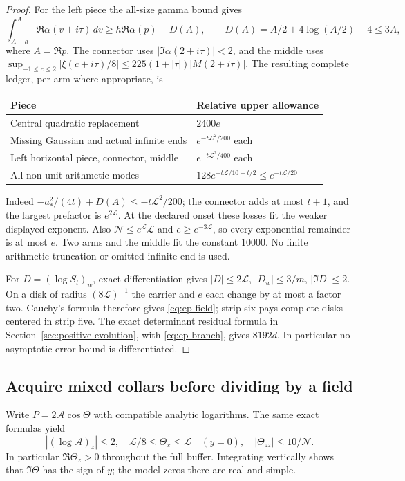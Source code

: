 \begin{proof}
For the left piece the all-size gamma bound gives
\[
 \int_{A-h}^{A}\Re\alpha(v+i\tau)\,dv
 \ge h\Re\alpha(p)-D(A),\qquad
 D(A)=A/2+4\log(A/2)+4\le3A,
\]
where $A=\Re p$. The connector uses $|\Im\alpha(2+i\tau)|<2$,
and the middle uses
$\sup_{-1\le c\le2}|\xi(c+i\tau)/8|
 \le225(1+|\tau|)|M(2+i\tau)|$.
The resulting complete ledger, per arm where appropriate, is
\begin{center}\small
\begin{tabular}{@{}ll@{}}\toprule
Piece & Relative upper allowance\\\midrule
Central quadratic replacement & $2400e$\\
Missing Gaussian and actual infinite ends & $e^{-t\mathcal L^2/200}$ each\\
Left horizontal piece, connector, middle & $e^{-t\mathcal L^2/400}$ each\\
All non-unit arithmetic modes & $128e^{-t\mathcal L/10+t/2}
                                      \le e^{-t\mathcal L/20}$\\\bottomrule
\end{tabular}\end{center}
Indeed $-a_*^2/(4t)+D(A)\le-t\mathcal L^2/200$; the connector
adds at most $t+1$, and the largest prefactor is $e^{2\mathcal L}$.
At the declared onset these losses fit the weaker displayed exponent.
Also $\mathcal N\le e^{\mathcal L}\mathcal L$ and
$e\ge e^{-3\mathcal L}$, so every exponential remainder is at most $e$.
Two arms and the middle fit the constant $10000$. No finite arithmetic
truncation or omitted infinite end is used.

For $D=(\log S_t)_w$, exact differentiation gives
$|D|\le2\mathcal L$, $|D_w|\le3/m$, $|\Im D|\le2$.
On a disk of radius $(8\mathcal L)^{-1}$ the carrier and $e$ each
change by at most a factor two. Cauchy's formula therefore gives
\eqref{eq:ep-field}; strip six pays complete disks centered in strip
five. The exact determinant residual formula in
Section~\ref{sec:positive-evolution}, with \eqref{eq:ep-branch}, gives
$8192d$. In particular no asymptotic error bound is differentiated.
\end{proof}

\subsection{Acquire mixed collars before dividing by a field}
Write $P=2\mathcal A\cos\Theta$ with compatible analytic logarithms.
The same exact formulas yield
\begin{equation}
 |(\log\mathcal A)_z|\le2,\quad
 \mathcal L/8\le\Theta_x\le\mathcal L\quad(y=0),\quad
 |\Theta_{zz}|\le10/\mathcal N.
 \label{eq:ep-phase}
\end{equation}
In particular $\Re\Theta_z>0$ throughout the full buffer. Integrating
vertically shows that $\Im\Theta$ has the sign of $y$; the model zeros
there are real and simple.

